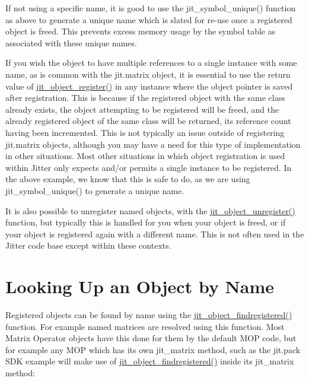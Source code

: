 If not using a specific name, it is good to use the jit\_\-symbol\_\-unique() function as above to generate a unique name which is slated for re-\/use once a registered object is freed. This prevents excess memory usage by the symbol table as associated with these unique names.

If you wish the object to have multiple references to a single instance with some name, as is common with the jit.matrix object, it is essential to use the return value of \hyperlink{group__objectmod_gabcf088a00f36b6af8ce5896b81e4d0ef}{jit\_\-object\_\-register()} in any instance where the object pointer is saved after registration. This is because if the registered object with the same class already exists, the object attempting to be registered will be freed, and the already registered object of the same class will be returned, its reference count having been incremented. This is not typically an issue outside of registering jit.matrix objects, although you may have a need for this type of implementation in other situations. Most other situations in which object registration is used within Jitter only expects and/or permits a single instance to be registered. In the above example, we know that this is safe to do, as we are using jit\_\-symbol\_\-unique() to generate a unique name.

It is also possible to unregister named objects, with the \hyperlink{group__objectmod_ga21f77a08c1a98aaf68e4b2913487be0f}{jit\_\-object\_\-unregister()} function, but typically this is handled for you when your object is freed, or if your object is registered again with a different name. This is not often used in the Jitter code base except within these contexts.\hypertarget{chapter_jit_notification_chapter_jit_notification_lookup}{}\section{Looking Up an Object by Name}\label{chapter_jit_notification_chapter_jit_notification_lookup}
Registered objects can be found by name using the \hyperlink{group__objectmod_ga328c0beb469f32437b756852fe8583bf}{jit\_\-object\_\-findregistered()} function. For example named matrices are resolved using this function. Most Matrix Operator objects have this done for them by the default MOP code, but for example any MOP which has its own jit\_\-matrix method, such as the jit.pack SDK example will make use of \hyperlink{group__objectmod_ga328c0beb469f32437b756852fe8583bf}{jit\_\-object\_\-findregistered()} inside its jit\_\-matrix method:



